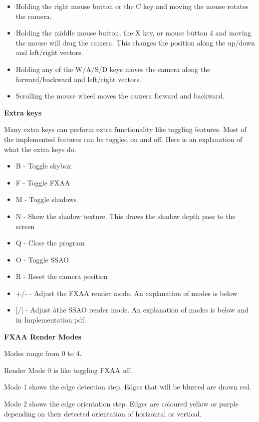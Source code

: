 \documentclass[10pt]{article}
\begin{document}
	\begin{itemize}
		\item Holding the right mouse button or the C key and moving the mouse rotates the camera.
		\item Holding the middle mouse button, the X key, or mouse button 4 and moving the mouse will drag the camera. This changes the position along the up/down and left/right vectors.
		\item Holding any of the W/A/S/D keys moves the camera along the forward/backward and left/right vectors.
		\item Scrolling the mouse wheel moves the camera forward and backward.
	\end{itemize}
	
	\begin{center}
		\bf Extra keys
	\end{center}
	Many extra keys can perform extra functionality like toggling features. Most of the implemented features can be toggled on and off. Here is an explanation of what the extra keys do.
	
	\begin{itemize}
		\item B - Toggle skybox
		\item F - Toggle FXAA
		\item M - Toggle shadows
		\item N - Show the shadow texture. This draws the shadow depth pass to the screen
		\item Q - Close the program
		\item O - Toggle SSAO
		\item R - Reset the camera position
		\item +/- - Adjust the FXAA render mode. An explanation of modes is below
		\item {[/] - Adjust åthe SSAO render mode. An explanation of modes is below and in Implementation.pdf.}
	\end{itemize}
	
	\begin{center}
		\bf FXAA Render Modes
	\end{center}
	
	Modes range from 0 to 4.
	
	Render Mode 0 is like toggling FXAA off.
	
	Mode 1 shows the edge detection step. Edges that will be blurred are drawn red.
	
	Mode 2 shows the edge orientation step. Edges are coloured yellow or purple depending on their detected orientation of horizontal or vertical.
	
\end{document}
